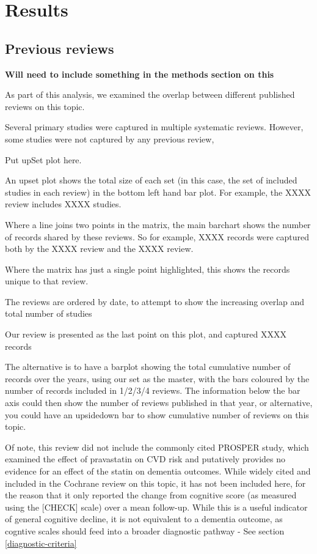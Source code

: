 \documentclass[a4paper, twoside]{templates/ociamthesis}
\begin{document}
\hypertarget{results}{%
\section{Results}\label{results}}

\hypertarget{previous-reviews}{%
\subsection{Previous reviews}\label{previous-reviews}}

\textbf{Will need to include something in the methods section on this}

As part of this analysis, we examined the overlap between different published reviews on this topic.

Several primary studies were captured in multiple systematic reviews. However, some studies were not captured by any previous review,

Put upSet plot here.

An upset plot shows the total size of each set (in this case, the set of included studies in each review) in the bottom left hand bar plot. For example, the XXXX review includes XXXX studies.

Where a line joins two points in the matrix, the main barchart shows the number of records shared by these reviews. So for example, XXXX records were captured both by the XXXX review and the XXXX review.

Where the matrix has just a single point highlighted, this shows the records unique to that review.

The reviews are ordered by date, to attempt to show the increasing overlap and total number of studies

Our review is presented as the last point on this plot, and captured XXXX records

The alternative is to have a barplot showing the total cumulative number of records over the years, using our set as the master, with the bars coloured by the number of records included in 1/2/3/4 reviews. The information below the bar axis could then show the number of reviews published in that year, or alternative, you could have an upsidedown bar to show cumulative number of reviews on this topic.

Of note, this review did not include the commonly cited PROSPER study, which examined the effect of pravastatin on CVD risk and putatively provides no evidence for an effect of the statin on dementia outcomes. While widely cited and included in the Cochrane review on this topic, it has not been included here, for the reason that it only reported the change from cognitive score (as measured using the {[}CHECK{]} scale) over a mean follow-up. While this is a useful indicator of general cognitive decline, it is not equivalent to a dementia outcome, as cogntive scales should feed into a broader diagnostic pathway - See section \ref{diagnostic-criteria}
\end{document}
